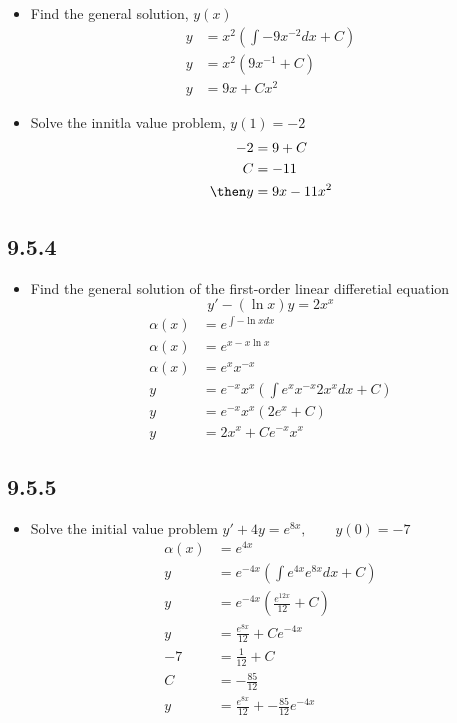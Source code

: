 \begin{itemize}
\begin{itemize}
\begin{itemize}
        \item Find the general solution, \(y(x)\)
          \begin{align*}
            y &= x^2 \left( \int -9x^{-2} dx + C\right)  \\
            y &= x^2 (9x^{-1} + C) \\
            y &= 9x + Cx^2
          \end{align*}

        \item Solve the innitla value problem, \(y(1) = -2\)
          \begin{align*}
            -2 &= 9 + C \\
            C &= -11 \\
            \then
            y &= 9x - 11x^2
          \end{align*}
      \end{itemize}
  \end{itemize}

  \subsection{9.5.4}
  \begin{itemize}
    \item Find the general solution of the first-order linear differetial
      equation
      \[%
        y' - (\ln x)y = 2x^{x}
      \]%
      \begin{align*}
        \alpha (x) &= e^{\int -\ln x dx} \\
        \alpha (x) &= e^{x-x\ln x} \\
        \alpha (x) &= e^x x^{-x} \\
        y &= e^{-x}x^x \left( \int e^x x^{-x} 2x^x dx + C \right)  \\
        y &= e^{-x}x^x (2e^x + C) \\
        y &= 2x^x + Ce^{-x}x^{x}
      \end{align*}
  \end{itemize}

  \subsection{9.5.5}
  \begin{itemize}
    \item Solve the initial value problem \(y' + 4y = e^{8x}, \qquad y(0) = -7
      \)
      \begin{align*}
        \alpha (x) &= e^{4x} \\
        y &= e^{-4x} \left( \int e^{4x} e^{8x} dx + C \right) \\
        y &= e^{-4x} \left(  \frac{e^{12x}}{12} + C \right) \\
        y &= \frac{e^{8x}}{12} + Ce^{-4x} \\
        -7 &= \frac{1}{12} + C \\
        C &= -\frac{85}{12} \\
        y &= \frac{e^{8x}}{12} + -\frac{85}{12}e^{-4x} \\
      \end{align*}
  \end{itemize}



\end{itemize}
